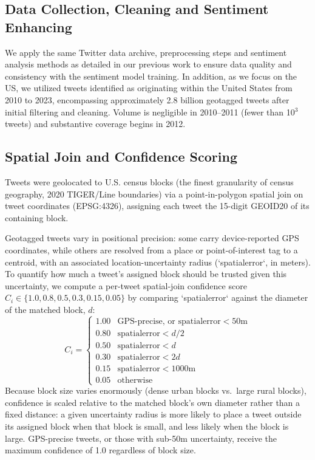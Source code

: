 \documentclass[fleqn,10pt]{wlscirep}
\begin{document}


\subsection*{Data Collection, Cleaning and Sentiment Enhancing}


We apply the same Twitter data archive, preprocessing steps and sentiment analysis methods as detailed in our previous work \cite{chaiTwitterSentimentGeographical2023a} to ensure data quality and consistency with the sentiment model training. In addition, as we focus on the US, we utilized tweets identified as originating within the United States from 2010 to 2023, encompassing approximately 2.8 billion geotagged tweets after initial filtering and cleaning. Volume is negligible in 2010--2011 (fewer than 10$^3$ tweets) and substantive coverage begins in 2012.


\subsection*{Spatial Join and Confidence Scoring}

Tweets were geolocated to U.S. census blocks (the finest granularity of census geography, 2020 TIGER/Line boundaries) via a point-in-polygon spatial join on tweet coordinates (EPSG:4326), assigning each tweet the 15-digit GEOID20 of its containing block.

Geotagged tweets vary in positional precision: some carry device-reported GPS coordinates, while others are resolved from a place or point-of-interest tag to a centroid, with an associated location-uncertainty radius (`spatialerror`, in meters). To quantify how much a tweet's assigned block should be trusted given this uncertainty, we compute a per-tweet spatial-join confidence score $C_i \in \{1.0, 0.8, 0.5, 0.3, 0.15, 0.05\}$ by comparing `spatialerror` against the diameter of the matched block, $d$:
\[
C_i =
\begin{cases}
1.00 & \text{GPS-precise, or spatialerror} < 50\text{m} \\
0.80 & \text{spatialerror} < d/2 \\
0.50 & \text{spatialerror} < d \\
0.30 & \text{spatialerror} < 2d \\
0.15 & \text{spatialerror} < 1000\text{m} \\
0.05 & \text{otherwise}
\end{cases}
\]
Because block size varies enormously (dense urban blocks vs.\ large rural blocks), confidence is scaled relative to the matched block's own diameter rather than a fixed distance: a given uncertainty radius is more likely to place a tweet outside its assigned block when that block is small, and less likely when the block is large. GPS-precise tweets, or those with sub-50m uncertainty, receive the maximum confidence of 1.0 regardless of block size.
\end{document}
